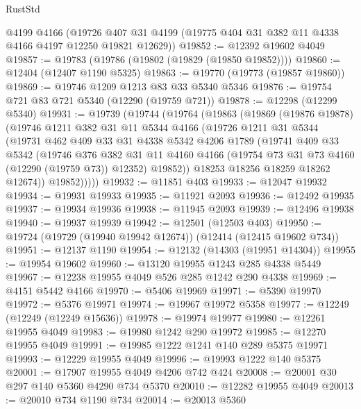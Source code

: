 \begin{lexlean}{RustStd}
\begin{coremodule}
    @4199
    @4166
    (@19726 @407 @31 @4199 (@19775 @404 @31 @382 @11 @4338 @4166 @4197 @12250 @19821 @12629))
@19852 := @12392 @19602 @4049
@19857 := @19783 (@19786 (@19802 (@19829 (@19850 @19852))))
@19860 := @12404 (@12407 @1190 @5325)
@19863 := @19770 (@19773 (@19857 @19860))
@19869 := @19746 @1209 @1213 @83 @33 @5340 @5346
@19876 := @19754 @721 @83 @721 @5340 (@12290 (@19759 @721))
@19878 := @12298 (@12299 @5340)
@19931 := @19739
    (@19744
      (@19764
        (@19863
          (@19869
            (@19876 @19878)
            (@19746
              @1211
              @382
              @31
              @11
              @5344
              @4166
              (@19726
                @1211
                @31
                @5344
                (@19731
                  @462
                  @409
                  @33
                  @31
                  @4338
                  @5342
                  @4206
                  @1789
                  (@19741
                    @409
                    @33
                    @5342
                    (@19746
                      @376
                      @382
                      @31
                      @11
                      @4160
                      @4166
                      (@19754 @73 @31 @73 @4160 (@12290 (@19759 @73)) @12352)
                      @19852))
                  @18253
                  @18256
                  @18259
                  @18262
                  @12674))
              @19852)))))
@19932 := @11851 @403
@19933 := @12047 @19932
@19934 := @19931 @19933
@19935 := @11921 @2093
@19936 := @12492 @19935
@19937 := @19934 @19936
@19938 := @11945 @2093
@19939 := @12496 @19938
@19940 := @19937 @19939
@19942 := @12501 (@12503 @403)
@19950 := @19724 (@19729 (@19940 @19942 @12674)) (@12414 (@12415 @19602 @734))
@19951 := @12137 @1190
@19954 := @12132 (@14303 (@19951 @14304))
@19955 := @19954 @19602
@19960 := @13120 @19955 @1243 @285 @4338 @5449
@19967 := @12238 @19955 @4049 @526 @285 @1242 @290 @4338
@19969 := @4151 @5442 @4166
@19970 := @5406 @19969
@19971 := @5390 @19970
@19972 := @5376 @19971
@19974 := @19967 @19972 @5358
@19977 := @12249 (@12249 (@12249 @15636))
@19978 := @19974 @19977
@19980 := @12261 @19955 @4049
@19983 := @19980 @1242 @290 @19972
@19985 := @12270 @19955 @4049
@19991 := @19985 @1222 @1241 @140 @289 @5375 @19971
@19993 := @12229 @19955 @4049
@19996 := @19993 @1222 @140 @5375
@20001 := @17907 @19955 @4049 @4206 @742 @424
@20008 := @20001 @30 @297 @140 @5360 @4290 @734 @5370
@20010 := @12282 @19955 @4049
@20013 := @20010 @734 @1190 @734
@20014 := @20013 @5360

\end{coremodule}
\end{lexlean}
